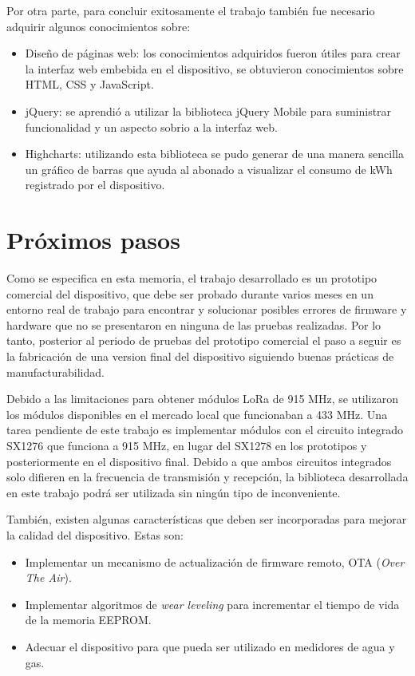 Por otra parte, para concluir exitosamente el trabajo también fue necesario adquirir algunos conocimientos sobre:

\begin{itemize}
	\item Diseño de páginas web: los conocimientos adquiridos fueron útiles para crear la interfaz web embebida en el dispositivo, se obtuvieron conocimientos sobre HTML, CSS y JavaScript.
	\item jQuery: se aprendió a utilizar la biblioteca jQuery Mobile para suministrar funcionalidad y un aspecto sobrio a la interfaz web.
	\item Highcharts: utilizando esta biblioteca se pudo generar de una manera sencilla un gráfico de barras que ayuda al abonado a visualizar el consumo de kWh registrado por el dispositivo.
\end{itemize}

\section{Próximos pasos}

Como se especifica en esta memoria, el trabajo desarrollado es un prototipo comercial del dispositivo, que debe ser probado durante varios meses en un entorno real de trabajo para encontrar y solucionar posibles errores de firmware y hardware que no se presentaron en ninguna de las pruebas realizadas. Por lo tanto, posterior al periodo de pruebas del prototipo comercial el paso a seguir es la fabricación de una version final del dispositivo siguiendo buenas prácticas de manufacturabilidad.

Debido a las limitaciones para obtener módulos LoRa de 915 MHz, se utilizaron los módulos disponibles en el mercado local que funcionaban a 433 MHz. Una tarea pendiente de este trabajo es implementar módulos con el circuito integrado SX1276 que funciona a 915 MHz, en lugar del SX1278 en los prototipos y posteriormente en el dispositivo final. Debido a que ambos circuitos integrados solo difieren en la frecuencia de transmisión y recepción, la biblioteca desarrollada en este trabajo podrá ser utilizada sin ningún tipo de inconveniente.

También, existen algunas características que deben ser incorporadas para mejorar la calidad del dispositivo. Estas son:

\begin{itemize}
	\item Implementar un mecanismo de actualización de firmware remoto, OTA (\textit{Over The Air}).
	\item Implementar algoritmos de \textit{wear leveling} para incrementar el tiempo de
	 vida de la memoria EEPROM.
	\item Adecuar el dispositivo para que pueda ser utilizado en medidores de agua y gas.
\end{itemize}
